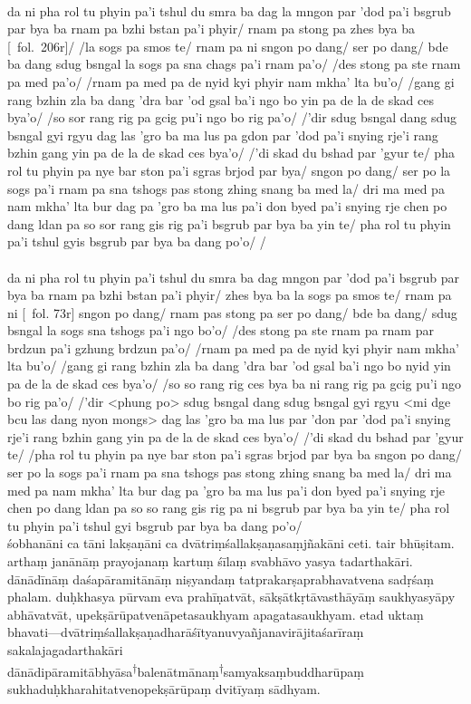 \documentclass[12pt]{article}
\newcommand{\crux} {\hspace{0em}\textsuperscript{†}\hspace{0em}}
\newcommand{\emdash} {\hspace{0em}—\hspace{0em}}
\begin{document}
\textbf{\TVA}\\
da ni pha rol tu phyin pa'i tshul du smra ba dag la mngon par 'dod pa'i bsgrub par bya ba rnam pa bzhi bstan pa'i phyir/ rnam pa stong pa zhes bya ba [\TVA\ fol.\ 206r]/ /la sogs pa smos te/ rnam pa ni sngon po dang/ ser po dang/ bde ba dang sdug bsngal la sogs pa sna chags pa'i rnam pa'o/ /des stong pa ste rnam pa med pa'o/ /rnam pa med pa de nyid kyi phyir nam mkha' lta bu'o/ /gang gi rang bzhin zla ba dang 'dra bar 'od gsal ba'i ngo bo yin pa de la de skad ces bya'o/ /so sor rang rig pa gcig pu'i ngo bo rig pa'o/ /'dir sdug bsngal dang sdug bsngal gyi rgyu dag las 'gro ba ma lus pa gdon par 'dod pa'i snying rje'i rang bzhin gang yin pa de la de skad ces bya'o/ /'di skad du bshad par 'gyur te/ pha rol tu phyin pa nye bar ston pa'i sgras brjod par bya/ sngon po dang/ ser po la sogs pa'i rnam pa sna tshogs pas stong zhing snang ba med la/ dri ma med pa nam mkha' lta bur dag pa 'gro ba ma lus pa'i don byed pa'i snying rje chen po dang ldan pa so sor rang gis rig pa'i bsgrub par bya ba yin te/ pha rol tu phyin pa'i tshul gyis bsgrub par bya ba dang po'o/ /\\

\textbf{\TVB}\\
da ni pha rol tu phyin pa'i tshul du smra ba dag mngon par 'dod pa'i bsgrub par bya ba rnam pa bzhi bstan pa'i phyir/ zhes bya ba la sogs pa smos te/ rnam pa ni [\TVB\ fol. 73r] sngon po dang/ rnam pas stong pa ser po dang/ bde ba dang/ sdug bsngal la sogs sna tshogs pa'i ngo bo'o/ /des stong pa ste rnam pa rnam par brdzun pa'i gzhung brdzun pa'o/ /rnam pa med pa de nyid kyi phyir nam mkha' lta bu'o/ /gang gi rang bzhin zla ba dang 'dra bar 'od gsal ba'i ngo bo nyid yin pa de la de skad ces bya'o/ /so so rang rig ces bya ba ni rang rig pa gcig pu'i ngo bo rig pa'o/ /'dir <phung po> sdug bsngal dang sdug bsngal gyi rgyu <mi dge bcu las dang nyon mongs> dag las 'gro ba ma lus par 'don par 'dod pa'i snying rje'i rang bzhin gang yin pa de la de skad ces bya'o/ /'di skad du bshad par 'gyur te/ /pha rol tu phyin pa nye bar ston pa'i sgras brjod par bya ba sngon po dang/ ser po la sogs pa'i rnam pa sna tshogs pas stong zhing snang ba med la/ dri ma med pa nam mkha' lta bur dag pa 'gro ba ma lus pa'i don byed pa'i snying rje chen po dang ldan pa so so rang gis rig pa ni bsgrub par bya ba yin te/ pha rol tu phyin pa'i tshul gyi bsgrub par bya ba dang po'o/\\

śobhanāni ca tāni lakṣaṇāni ca dvātriṃśallakṣaṇasaṃjñakāni ceti.
tair bhūṣitam.
arthaṃ janānāṃ prayojanaṃ kartuṃ śīlaṃ svabhāvo yasya tadarthakāri.
dānādīnāṃ daśapāramitānāṃ niṣyandaṃ tatprakarṣaprabhavatvena sadṛśaṃ phalam.
duḥkhasya pūrvam eva prahīṇatvāt, sākṣātkṛtāvasthāyāṃ\footnoteB{
	sākṣātkṛtāvasthāyāṃ] \EDD; sākṣātkṛtāvatāsthāyāṃ \MS
} saukhyasyāpy abhāvatvāt, upekṣārūpatvenāpetasaukhyam apagatasaukhyam.
etad uktaṃ bhavati\emdash dvātriṃśallakṣaṇadharāśītyanuvyañjanavirājitaśarīraṃ sakalajagadarthakāri dānādipāramitābhyāsa\crux balenātmānaṃ\footnoteB{
	°balenātmānaṃ] \MS\ \EDD; stobs kyis bdag nyid yang dag par rdzogs pa'i \TVA; stobs kyis byung ba yang dag par \TVB
}\crux samyaksaṃbuddharūpaṃ sukhaduḥkharahitatvenopekṣārūpaṃ dvitīyaṃ sādhyam.\\
\end{document}

